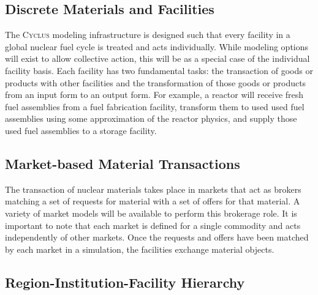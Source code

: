 \documentclass{anstrans}
\newcommand{\Cyclus}{\textsc{Cyclus }}
\begin{document}
\subsection{Discrete Materials and Facilities}

The \Cyclus modeling infrastructure is designed such that every
facility in a global nuclear fuel cycle is treated and acts
individually. While modeling options will exist to allow collective
action, this will be as a special case of the individual facility
basis. Each facility has two fundamental tasks: the transaction of
goods or products with other facilities and the transformation of
those goods or products from an input form to an output form.  For
example, a reactor will receive fresh fuel assemblies from a fuel
fabrication facility, transform them to used used fuel assemblies
using some approximation of the reactor physics, and supply those used
fuel assemblies to a storage facility.

\subsection{Market-based Material Transactions}

The transaction of nuclear materials takes place in markets that act
as brokers matching a set of requests for material with a set of
offers for that material. A variety of market models will be available
to perform this brokerage role. It is important to note that each
market is defined for a single commodity and acts independently of
other markets. Once the requests and offers have been matched by each
market in a simulation, the facilities exchange material objects.

\subsection{Region-Institution-Facility Hierarchy}
\end{document}
